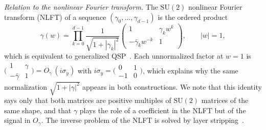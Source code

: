 \documentclass[
    reprint,
    amsmath,amssymb,
    aps,
    pra,
    superscriptaddress,
    floatfix
]{revtex4-2}
\theoremstyle{aps}
\newcommand{\SU}{\mathrm{SU}}
\newcommand{\PauliY}{\sigma_y}
\begin{document}
\emph{Relation to the nonlinear Fourier transform.}  The $\SU(2)$
nonlinear Fourier transform (NLFT) of a sequence
$(\gamma_0,\dots,\gamma_{d-1})$ is the ordered product
\begin{equation}
	\widehat\gamma(w)=\prod_{k=0}^{d-1}
	\frac{1}{\sqrt{1+|\gamma_k|^2}}
	\begin{pmatrix} 1 & \gamma_k w^k\\ -\bar\gamma_k w^{-k} & 1
	\end{pmatrix},\qquad |w|=1,
	\label{eq:nlft}
\end{equation}
which is equivalent to generalized
QSP~\cite{AlexisMnatsakanyanThiele2024,AlexisBeckerEtAl2026,Laneve2025b}.
Each unnormalized factor at $w=1$ is
$\bigl(\begin{smallmatrix}1&\gamma\\-\bar\gamma&1\end{smallmatrix}\bigr)
=O_\gamma\,(i\PauliY)$ with $i\PauliY=\bigl(\begin{smallmatrix}0&1\\
-1&0\end{smallmatrix}\bigr)$, which explains why the same
normalization $\sqrt{1+|\gamma|^2}$ appears in both constructions.
We note that this identity says only that both matrices are
positive multiples of $\SU(2)$ matrices of the same shape, and that
$\gamma$ plays the role of a coefficient in the NLFT but of the
signal in $O_\gamma$.  The inverse problem of the NLFT is solved by
layer stripping~\cite{NiSarkarYingLin2025,AlexisBeckerEtAl2026}.


\end{document}
